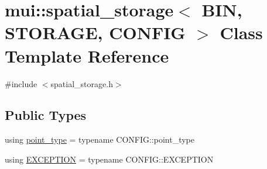 \hypertarget{classmui_1_1spatial__storage}{}\section{mui\+:\+:spatial\+\_\+storage$<$ B\+IN, S\+T\+O\+R\+A\+GE, C\+O\+N\+F\+IG $>$ Class Template Reference}
\label{classmui_1_1spatial__storage}


{\ttfamily \#include $<$spatial\+\_\+storage.\+h$>$}

\subsection*{Public Types}
\begin{DoxyCompactItemize}
\item 
using \hyperlink{classmui_1_1spatial__storage_a29c9b70a3becee947f2ffa55264d8fde}{point\+\_\+type} = typename C\+O\+N\+F\+I\+G\+::point\+\_\+type
\item 
using \hyperlink{classmui_1_1spatial__storage_a46075f28c96905aa1bc13a1690c1fcaf}{E\+X\+C\+E\+P\+T\+I\+ON} = typename C\+O\+N\+F\+I\+G\+::\+E\+X\+C\+E\+P\+T\+I\+ON
\end{DoxyCompactItemize}
